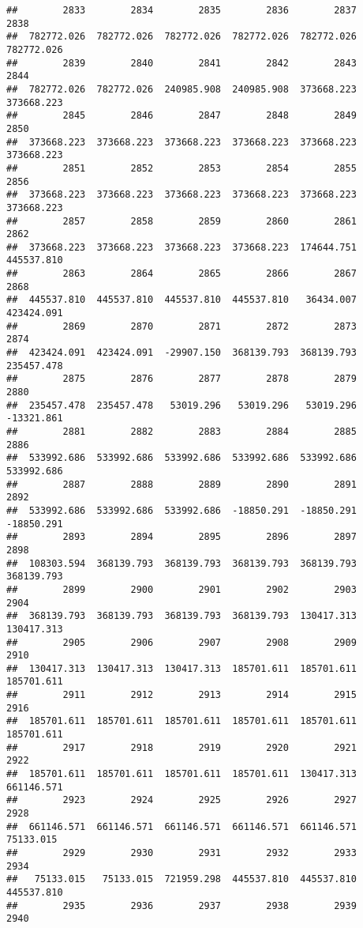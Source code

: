 \documentclass[
]{book}
\begin{document}
\begin{verbatim}
##        2833        2834        2835        2836        2837        2838 
##  782772.026  782772.026  782772.026  782772.026  782772.026  782772.026 
##        2839        2840        2841        2842        2843        2844 
##  782772.026  782772.026  240985.908  240985.908  373668.223  373668.223 
##        2845        2846        2847        2848        2849        2850 
##  373668.223  373668.223  373668.223  373668.223  373668.223  373668.223 
##        2851        2852        2853        2854        2855        2856 
##  373668.223  373668.223  373668.223  373668.223  373668.223  373668.223 
##        2857        2858        2859        2860        2861        2862 
##  373668.223  373668.223  373668.223  373668.223  174644.751  445537.810 
##        2863        2864        2865        2866        2867        2868 
##  445537.810  445537.810  445537.810  445537.810   36434.007  423424.091 
##        2869        2870        2871        2872        2873        2874 
##  423424.091  423424.091  -29907.150  368139.793  368139.793  235457.478 
##        2875        2876        2877        2878        2879        2880 
##  235457.478  235457.478   53019.296   53019.296   53019.296  -13321.861 
##        2881        2882        2883        2884        2885        2886 
##  533992.686  533992.686  533992.686  533992.686  533992.686  533992.686 
##        2887        2888        2889        2890        2891        2892 
##  533992.686  533992.686  533992.686  -18850.291  -18850.291  -18850.291 
##        2893        2894        2895        2896        2897        2898 
##  108303.594  368139.793  368139.793  368139.793  368139.793  368139.793 
##        2899        2900        2901        2902        2903        2904 
##  368139.793  368139.793  368139.793  368139.793  130417.313  130417.313 
##        2905        2906        2907        2908        2909        2910 
##  130417.313  130417.313  130417.313  185701.611  185701.611  185701.611 
##        2911        2912        2913        2914        2915        2916 
##  185701.611  185701.611  185701.611  185701.611  185701.611  185701.611 
##        2917        2918        2919        2920        2921        2922 
##  185701.611  185701.611  185701.611  185701.611  130417.313  661146.571 
##        2923        2924        2925        2926        2927        2928 
##  661146.571  661146.571  661146.571  661146.571  661146.571   75133.015 
##        2929        2930        2931        2932        2933        2934 
##   75133.015   75133.015  721959.298  445537.810  445537.810  445537.810 
##        2935        2936        2937        2938        2939        2940 

\end{verbatim}
\end{document}
